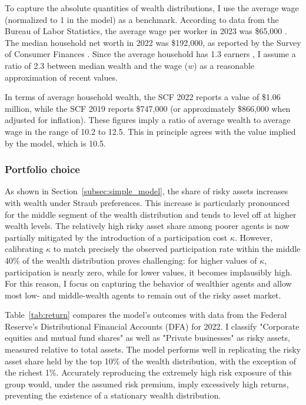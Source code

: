 \documentclass[12pt]{article}
\begin{document}
To capture the absolute quantities of wealth distributions, I use the average wage (normalized to 1 in the model) as a benchmark. According to data from the Bureau of Labor Statistics, the average wage per worker in 2023 was \$65,000 \parencite{bls_2023}. The median household net worth in 2022 was \$192,000, as reported by the Survey of Consumer Finances \parencite{scf2022}. Since the average household has 1.3 earners \parencite{uscensus2022}, I assume a ratio of 2.3 between median wealth and the wage ($w$) as a reasonable approximation of recent values.

In terms of average household wealth, the SCF 2022 reports a value of \$1.06 million, while the SCF 2019 reports \$747,000 (or approximately \$866,000 when adjusted for inflation). These figures imply a ratio of average wealth to average wage in the range of 10.2 to 12.5. This in principle agrees with the value implied by the model, which is 10.5.

\subsubsection{Portfolio choice}

As shown in Section~\ref{subsec:simple_model}, the share of risky assets increases with wealth under Straub preferences. This increase is particularly pronounced for the middle segment of the wealth distribution and tends to level off at higher wealth levels. The relatively high risky asset share among poorer agents is now partially mitigated by the introduction of a participation cost $\kappa$. However, calibrating $\kappa$ to match precisely the observed participation rate within the middle 40\% of the wealth distribution proves challenging: for higher values of $\kappa$, participation is nearly zero, while for lower values, it becomes implausibly high. For this reason, I focus on capturing the behavior of wealthier agents and allow most low- and middle-wealth agents to remain out of the risky asset market.

Table~\ref{tab:return} compares the model's outcomes with data from the Federal Reserve's Distributional Financial Accounts (DFA) for 2022. I classify "Corporate equities and mutual fund shares" as well as "Private businesses" as risky assets, measured relative to total assets. The model performs well in replicating the risky asset share held by the top 10\% of the wealth distribution, with the exception of the richest 1\%. Accurately reproducing the extremely high risk exposure of this group would, under the assumed risk premium, imply excessively high returns, preventing the existence of a stationary wealth distribution.
\end{document}
